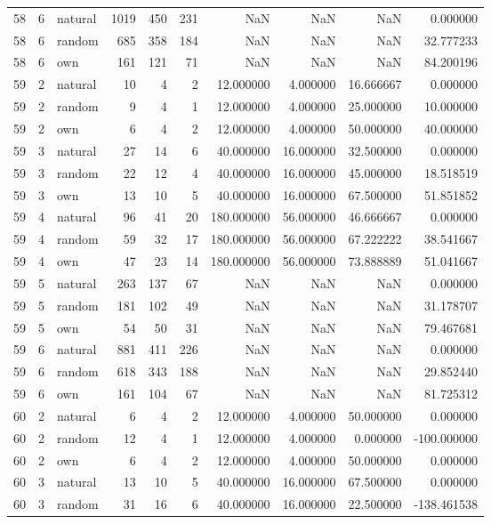 \begin{table}[htbp]
\begin{tabular}{rrlrrrrrrr}
58 & 6 & natural & 1019 & 450 & 231 & NaN & NaN & NaN & 0.000000 \\
58 & 6 & random & 685 & 358 & 184 & NaN & NaN & NaN & 32.777233 \\
58 & 6 & own & 161 & 121 & 71 & NaN & NaN & NaN & 84.200196 \\
59 & 2 & natural & 10 & 4 & 2 & 12.000000 & 4.000000 & 16.666667 & 0.000000 \\
59 & 2 & random & 9 & 4 & 1 & 12.000000 & 4.000000 & 25.000000 & 10.000000 \\
59 & 2 & own & 6 & 4 & 2 & 12.000000 & 4.000000 & 50.000000 & 40.000000 \\
59 & 3 & natural & 27 & 14 & 6 & 40.000000 & 16.000000 & 32.500000 & 0.000000 \\
59 & 3 & random & 22 & 12 & 4 & 40.000000 & 16.000000 & 45.000000 & 18.518519 \\
59 & 3 & own & 13 & 10 & 5 & 40.000000 & 16.000000 & 67.500000 & 51.851852 \\
59 & 4 & natural & 96 & 41 & 20 & 180.000000 & 56.000000 & 46.666667 & 0.000000 \\
59 & 4 & random & 59 & 32 & 17 & 180.000000 & 56.000000 & 67.222222 & 38.541667 \\
59 & 4 & own & 47 & 23 & 14 & 180.000000 & 56.000000 & 73.888889 & 51.041667 \\
59 & 5 & natural & 263 & 137 & 67 & NaN & NaN & NaN & 0.000000 \\
59 & 5 & random & 181 & 102 & 49 & NaN & NaN & NaN & 31.178707 \\
59 & 5 & own & 54 & 50 & 31 & NaN & NaN & NaN & 79.467681 \\
59 & 6 & natural & 881 & 411 & 226 & NaN & NaN & NaN & 0.000000 \\
59 & 6 & random & 618 & 343 & 188 & NaN & NaN & NaN & 29.852440 \\
59 & 6 & own & 161 & 104 & 67 & NaN & NaN & NaN & 81.725312 \\
60 & 2 & natural & 6 & 4 & 2 & 12.000000 & 4.000000 & 50.000000 & 0.000000 \\
60 & 2 & random & 12 & 4 & 1 & 12.000000 & 4.000000 & 0.000000 & -100.000000 \\
60 & 2 & own & 6 & 4 & 2 & 12.000000 & 4.000000 & 50.000000 & 0.000000 \\
60 & 3 & natural & 13 & 10 & 5 & 40.000000 & 16.000000 & 67.500000 & 0.000000 \\
60 & 3 & random & 31 & 16 & 6 & 40.000000 & 16.000000 & 22.500000 & -138.461538 \\

\end{tabular}
\end{table}
